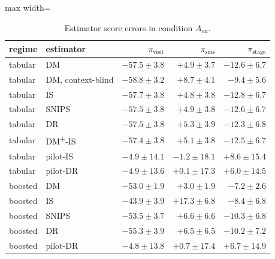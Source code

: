 \begin{table}[!htbp]
\centering
\caption{Estimator score errors in condition $A_{\mathrm{on}}$.}
\label{tab:campaignfullerrorsA_on}
\small
\begin{adjustbox}{max width=\linewidth}
\begin{tabular}{llrrr}
\toprule
regime & estimator & $\pi_{\mathrm{visit}}$ & $\pi_{\mathrm{sms}}$ & $\pi_{\mathrm{stage}}$ \\
\midrule
tabular & DM & $-57.5 \pm 3.8$ & $+4.9 \pm 3.7$ & $-12.6 \pm 6.7$ \\
tabular & DM, context-blind & $-58.8 \pm 3.2$ & $+8.7 \pm 4.1$ & $-9.4 \pm 5.6$ \\
tabular & IS & $-57.7 \pm 3.8$ & $+4.8 \pm 3.8$ & $-12.8 \pm 6.7$ \\
tabular & SNIPS & $-57.5 \pm 3.8$ & $+4.9 \pm 3.8$ & $-12.6 \pm 6.7$ \\
tabular & DR & $-57.5 \pm 3.8$ & $+5.3 \pm 3.9$ & $-12.3 \pm 6.8$ \\
tabular & DM\textsuperscript{+}-IS & $-57.4 \pm 3.8$ & $+5.1 \pm 3.8$ & $-12.5 \pm 6.7$ \\
tabular & pilot-IS & $-4.9 \pm 14.1$ & $-1.2 \pm 18.1$ & $+8.6 \pm 15.4$ \\
tabular & pilot-DR & $-4.9 \pm 13.6$ & $+0.1 \pm 17.3$ & $+6.0 \pm 14.5$ \\
boosted & DM & $-53.0 \pm 1.9$ & $+3.0 \pm 1.9$ & $-7.2 \pm 2.6$ \\
boosted & IS & $-43.9 \pm 3.9$ & $+17.3 \pm 6.8$ & $-8.4 \pm 6.8$ \\
boosted & SNIPS & $-53.5 \pm 3.7$ & $+6.6 \pm 6.6$ & $-10.3 \pm 6.8$ \\
boosted & DR & $-55.3 \pm 3.9$ & $+6.5 \pm 6.5$ & $-10.2 \pm 7.2$ \\
boosted & pilot-DR & $-4.8 \pm 13.8$ & $+0.7 \pm 17.4$ & $+6.7 \pm 14.9$ \\
\bottomrule
\end{tabular}
\end{adjustbox}
\end{table}
